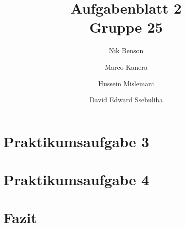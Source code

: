 \documentclass[a4paper, 12pt]{article}
\title{Aufgabenblatt 2\\Gruppe 25}
\author[1]{Nik Benson}
\author[2]{Marco Kanera}
\author[3]{Hussein Mislemani}
\author[4]{David Edward Ssebuliba}
\affil[1]{202123513}
\begin{document}
    \maketitle

    \newpage
    \tableofcontents
    \lstlistoflistings
    \newpage


    \section{Praktikumsaufgabe 3}\label{sec:praktikumsaufgabe-3}
    

    \section{Praktikumsaufgabe 4}\label{sec:praktikumsaufgabe-4}
    

    \section{Fazit}\label{sec:fazit}
    
\end{document}
